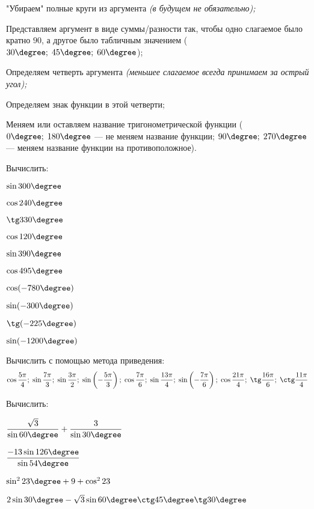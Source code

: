 \begin{listofex}
\begin{enumcols}
		\item "Убираем"{ }полные круги из аргумента \textit{(в будущем не обязательно);}
		\item Представляем аргумент в виде суммы/разности так, чтобы одно слагаемое было кратно \( 90 \), а другое было табличным значением (\( 30\degree;\;45\degree;\;60\degree \));
		\item Определяем четверть аргумента \textit{(меньшее слагаемое всегда принимаем за острый угол);}
		\item Определяем знак функции в этой четверти;
		\item Меняем или оставляем название тригонометрической функции (\( 0\degree;\;180\degree \) --- не меняем название функции; \( 90\degree;\;270\degree \) --- меняем название функции на противоположное).
	\end{enumcols}
	\item Вычислить:
	\begin{enumcols}[itemcolumns=5]
		\item \( \sin 300\degree \)
		\item \( \cos 240\degree \)
		\item \( \tg 330\degree \)
		\item \( \cos 120\degree \)
		\item \( \sin 390\degree \)
		\item \( \cos 495\degree \)
		\item \( \cos (-780\degree) \)
		\item \( \sin (-300\degree) \)
		\item \( \tg (-225\degree) \)
		\item \( \sin (-1200\degree) \)
	\end{enumcols}
		\item Вычислить с помощью метода приведения:
		\[ \cos\dfrac{5\pi}{4};\;\sin\dfrac{7\pi}{3};\;\sin\dfrac{3\pi}{2};\;\sin\left( -\dfrac{5\pi}{3} \right);\;\cos\dfrac{7\pi}{6};\;\sin\dfrac{13\pi}{4};\;\sin\left( -\dfrac{7\pi}{6}  \right);\;\cos\dfrac{21\pi}{4};\;\tg\dfrac{16\pi}{6};\;\ctg\dfrac{11\pi}{4} \]
		\item Вычислить:
		\begin{enumcols}[itemcolumns=2]
			\item \( \dfrac{\sqrt{3}}{\sin60\degree}+\dfrac{3}{\sin30\degree} \)
			\item \( \dfrac{-13\sin126\degree}{\sin54\degree} \)
			\item \( \sin^223\degree+9+\cos^223 \)
			\item \( 2\sin30\degree-\sqrt{3}\sin60\degree\ctg45\degree\tg30\degree\)

\end{enumcols}
\end{listofex}

